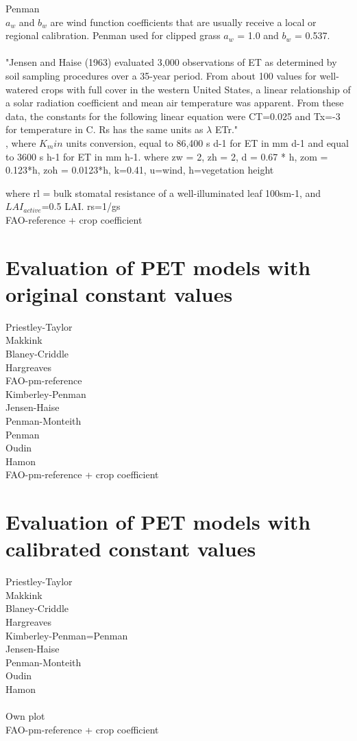 \documentclass[hydrology,article,submit,moreauthors,pdftex]{Definitions/mdpi}
\begin{document}
Penman \\
$a_w$ and $b_w$ are wind function coefficients that are usually receive a local or regional calibration.
Penman \cite{penman1963vegetation} used for clipped grass \cite{asce2005asce} $a_w$ = 1.0 and $b_w$ = 0.537.\\
\\
"Jensen and Haise (1963) evaluated 3,000 observations of ET as determined by soil sampling procedures over a 35-year period. From about 100 values for well-watered crops with full cover in the western United States, a linear relationship of a solar radiation coefficient and mean air temperature was apparent. From these data, the constants for the following linear equation were CT=0.025 and Tx=-3 for temperature in C. Rs has the same units as $\lambda$ ETr." \\

, where $K_min$ units conversion, equal to 86,400 s d-1 for ET in mm d-1 and equal to 3600 s h-1 for ET in mm h-1.
where zw = 2, zh = 2, d = 0.67 * h, zom = 0.123*h, zoh = 0.0123*h, k=0.41, u=wind, h=vegetation height

where rl = bulk stomatal resistance of a well-illuminated leaf 100sm-1, and $LAI_{active}$=0.5 LAI. rs=1/gs \\

FAO-reference + crop coefficient

\section{Evaluation of PET models with original constant values}
Priestley-Taylor \\
Makkink \\
Blaney-Criddle \\
Hargreaves \\
FAO-pm-reference \\
Kimberley-Penman \\
Jensen-Haise \\
Penman-Monteith \\
Penman \\
Oudin \\
Hamon \\
FAO-pm-reference + crop coefficient \\

\section{Evaluation of PET models with calibrated constant values}
Priestley-Taylor \\
Makkink \\
Blaney-Criddle \\
Hargreaves \\
Kimberley-Penman=Penman \\
Jensen-Haise \\
Penman-Monteith \\
Oudin \\
Hamon \\
\\
Own plot\\
FAO-pm-reference + crop coefficient \\
\end{document}

